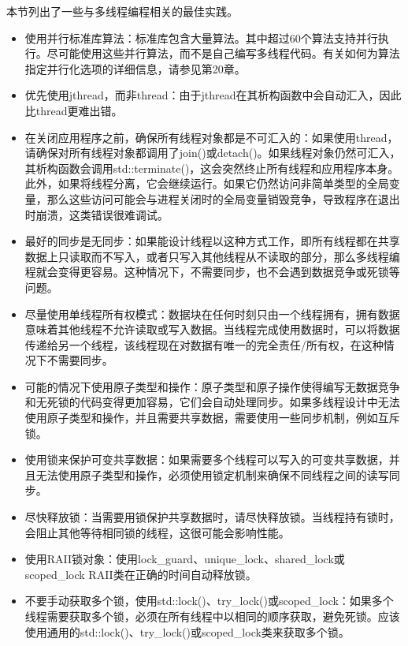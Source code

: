 本节列出了一些与多线程编程相关的最佳实践。

\begin{itemize}
\item
使用并行标准库算法：标准库包含大量算法。其中超过60个算法支持并行执行。尽可能使用这些并行算法，而不是自己编写多线程代码。有关如何为算法指定并行化选项的详细信息，请参见第20章。

\item
优先使用jthread，而非thread：由于jthread在其析构函数中会自动汇入，因此比thread更难出错。

\item
在关闭应用程序之前，确保所有线程对象都是不可汇入的：如果使用thread，请确保对所有线程对象都调用了join()或detach()。如果线程对象仍然可汇入，其析构函数会调用std::terminate()，这会突然终止所有线程和应用程序本身。此外，如果将线程分离，它会继续运行。如果它仍然访问非简单类型的全局变量，那么这些访问可能会与进程关闭时的全局变量销毁竞争，导致程序在退出时崩溃，这类错误很难调试。

\item
最好的同步是无同步：如果能设计线程以这种方式工作，即所有线程都在共享数据上只读取而不写入，或者只写入其他线程从不读取的部分，那么多线程编程就会变得更容易。这种情况下，不需要同步，也不会遇到数据竞争或死锁等问题。

\item
尽量使用单线程所有权模式：数据块在任何时刻只由一个线程拥有，拥有数据意味着其他线程不允许读取或写入数据。当线程完成使用数据时，可以将数据传递给另一个线程，该线程现在对数据有唯一的完全责任/所有权，在这种情况下不需要同步。

\item
可能的情况下使用原子类型和操作：原子类型和原子操作使得编写无数据竞争和无死锁的代码变得更加容易，它们会自动处理同步。如果多线程设计中无法使用原子类型和操作，并且需要共享数据，需要使用一些同步机制，例如互斥锁。

\item
使用锁来保护可变共享数据：如果需要多个线程可以写入的可变共享数据，并且无法使用原子类型和操作，必须使用锁定机制来确保不同线程之间的读写同步。

\item
尽快释放锁：当需要用锁保护共享数据时，请尽快释放锁。当线程持有锁时，会阻止其他等待相同锁的线程，这很可能会影响性能。

\item
使用RAII锁对象：使用lock\_guard、unique\_lock、shared\_lock或scoped\_lock RAII类在正确的时间自动释放锁。

\item
不要手动获取多个锁，使用std::lock()、try\_lock()或scoped\_lock：如果多个线程需要获取多个锁，必须在所有线程中以相同的顺序获取，避免死锁。应该使用通用的std::lock()、try\_lock()或scoped\_lock类来获取多个锁。


\end{itemize}
